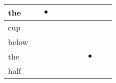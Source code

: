 \documentclass[landscape]{article}
\newcommand{\ssp}{\hspace{2pt}}
\newcommand{\mex}{\cellcolor{g}$\bullet$}
\begin{document}
\begin{tabular}{|l|p{10pt}|p{10pt}|p{10pt}|p{10pt}|p{10pt}|p{10pt}|p{10pt}|p{10pt}|p{10pt}|}
\hline
\ssp \cellcolor{ref1}the \ssp&\hspace{2pt}&\hspace{2pt}\mex&\hspace{2pt}&\hspace{2pt}&\hspace{2pt}&\hspace{2pt}&\hspace{2pt}&\hspace{2pt}&\hspace{2pt}\\
\hline
\ssp cup \ssp&\hspace{2pt}&\hspace{2pt}&\hspace{2pt}&\hspace{2pt}&\hspace{2pt}&\hspace{2pt}&\hspace{2pt}&\hspace{2pt}&\hspace{2pt}\\
\hline
\ssp below \ssp&\hspace{2pt}&\hspace{2pt}&\hspace{2pt}&\hspace{2pt}&\hspace{2pt}&\hspace{2pt}&\hspace{2pt}&\hspace{2pt}&\hspace{2pt}\\
\hline
\ssp \cellcolor{ref6}the \ssp&\hspace{2pt}&\hspace{2pt}&\hspace{2pt}&\hspace{2pt}&\hspace{2pt}&\hspace{2pt}&\hspace{2pt}\mex&\hspace{2pt}&\hspace{2pt}\\
\hline
\ssp half \ssp&\hspace{2pt}&\hspace{2pt}&\hspace{2pt}&\hspace{2pt}&\hspace{2pt}&\hspace{2pt}&\hspace{2pt}&\hspace{2pt}&\hspace{2pt}\\

\end{tabular}
\end{document}
